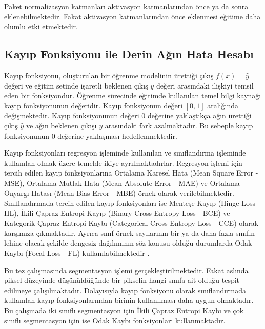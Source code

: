Paket normalizasyon katmanları aktivasyon katmanlarından önce ya da sonra eklenebilmektedir. Fakat aktivasyon katmanlarından önce eklenmesi eğitime daha olumlu etki etmektedir.

\subsection{Kayıp Fonksiyonu ile Derin Ağın Hata Hesabı}
Kayıp fonksiyonu, oluşturulan bir öğrenme modelinin ürettiği çıkış $f(x)=\hat{ y }$ değeri ve eğitim setinde işaretli beklenen çıkış $y$ değeri arasındaki ilişkiyi temsil eden bir fonksiyondur. Öğrenme sürecinde eğitimde kullanılan temel bilgi kaynağı kayıp fonksiyonunun değeridir. Kayıp fonksiyonun değeri $[0,1]$ aralığında değişmektedir. Kayıp fonksiyonunun değeri $0$ değerine yaklaştıkça ağın ürettiği çıkış $\hat{ y }$ ve ağın beklenen çıkışı $y$ arasındaki fark azalmaktadır. Bu sebeple kayıp fonksiyonunun $0$ değerine yaklaşması hedeflenmektedir. 

Kayıp fonksiyonları regresyon işleminde kullanılan ve sınıflandırma işleminde kullanılan olmak üzere temelde ikiye ayrılmaktadırlar. Regresyon işlemi için tercih edilen kayıp fonksiyonlarına Ortalama Karesel Hata (Mean Square Error - MSE), Ortalama Mutlak Hata (Mean Absolute Error - MAE) ve Ortalama Önyargı Hatası (Mean Bias Error - MBE) örnek olarak verilebilmektedir. Sınıflandırmada tercih edilen kayıp fonksiyonları ise Menteşe Kayıp (Hinge Loss - HL), İkili Çapraz Entropi Kayıp (Binary Cross Entropy Loss - BCE) ve Kategorik Çapraz Entropi Kaybı (Categorical Cross Entropy Loss - CCE) olarak karşımıza çıkmaktadır. Ayrıca sınıf örnek sayılarının bir ya da daha fazla sınıfın lehine olacak şekilde dengesiz dağılımının söz konusu olduğu durumlarda Odak Kaybı  (Focal Loss - FL) kullanılabilmektedir \cite{lin2017focal}.  

Bu tez çalışmasında segmentasyon işlemi gerçekleştirilmektedir. Fakat aslında piksel düzeyinde düşünüldüğünde bir pikselin hangi sınıfa ait olduğu tespit edilmeye çalışılmaktadır. Dolayısıyla kayıp fonksiyonu olarak sınıflandırmada kullanılan kayıp fonksiyonlarından birinin kullanılması daha uygun olmaktadır. Bu çalışmada iki sınıflı segmentasyon için İkili Çapraz Entropi Kaybı ve çok sınıflı segmentasyon için ise Odak Kaybı fonksiyonları kullanmaktadır.  

